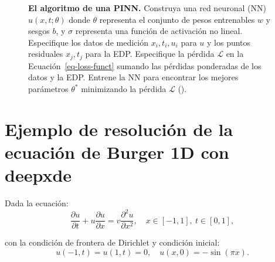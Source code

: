 \documentclass[
  spanish,
  us-letterpaper,
  DIV=11,
  numbers=noendperiod]{scrreprt}
\theoremstyle{plain}
\theoremstyle{definition}
\theoremstyle{remark}
\begin{document}
\begin{figure}


\caption{\label{fig-pinn_graph}\textbf{El algoritmo de una PINN.}
Construya una red neuronal (NN) \(u(x, t; \theta)\) donde \(\theta\)
representa el conjunto de pesos entrenables \(w\) y sesgos \(b\), y
\(\sigma\) representa una función de activación no lineal. Especifique
los datos de medición \({x_i, t_i, u_i}\) para \(u\) y los puntos
residuales \({x_j, t_j}\) para la EDP. Especifique la pérdida
\(\mathcal{L}\) en la Ecuación~\ref{eq-loss-funct} sumando las pérdidas
ponderadas de los datos y la EDP. Entrene la NN para encontrar los
mejores parámetros \(\mathbb{\theta^*}\) minimizando la pérdida
\(\mathcal{L}\) ().}

\end{figure}%

\section{Ejemplo de resolución de la ecuación de Burger 1D con
deepxde}\label{ejemplo-de-resoluciuxf3n-de-la-ecuaciuxf3n-de-burger-1d-con-deepxde}

Dada la ecuación: \[
\dfrac{\partial u}{\partial t} + u\dfrac{\partial u}{\partial x} = v\dfrac{\partial^2 u}{\partial x^2}, \quad x \in[-1,1], \ t\in[0,1],
\]

con la condición de frontera de Dirichlet y condición inicial: \[
u(-1,t) = u(1,t) = 0, \quad u(x,0)=-\sin(\pi x).
\]
\end{document}
